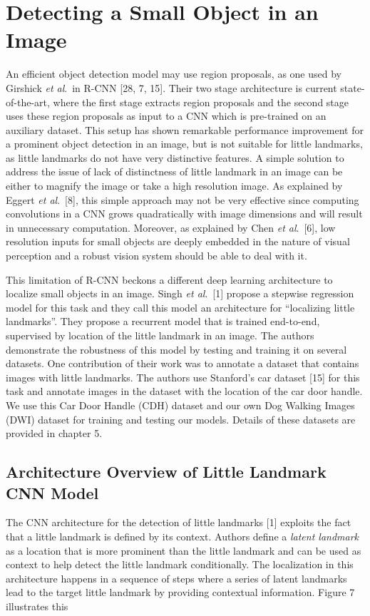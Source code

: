 \documentclass [11pt,letterpaper ,twoside ,openany ]{report}
\begin{document}
    \chapter{Detecting a Small Object in an Image}
    \doublespacing
    An efficient object detection model may use region proposals, as  one used by Girshick \textit{et al}.\ in R-CNN [28, 7, 15]. Their two stage architecture is current state-of-the-art, where the first stage extracts region proposals and the second stage uses these region proposals as input to a CNN which is pre-trained on an auxiliary dataset. This setup has shown remarkable performance improvement for a prominent object detection in an image, but is not suitable for little landmarks, as little landmarks do not have very distinctive features. A simple solution to address the issue of lack of distinctness of little landmark in an image can be either to magnify the image or take a high resolution image. As explained by Eggert \textit{et al}.\ [8], this simple approach may not be very effective since computing convolutions in a CNN grows quadratically with image dimensions and will result in unnecessary computation. Moreover, as explained by Chen \textit{et al}.\ [6], low resolution inputs for small objects are deeply embedded  in the nature of visual perception and a robust vision system should be able to deal with it.
        
    This limitation of R-CNN beckons a different deep learning architecture to localize small objects in an image. Singh \textit{et al}.\ [1] propose a stepwise regression model for this task and they call this model an architecture for ``localizing little landmarks''. They propose a recurrent model that is trained end-to-end, supervised by location of the little landmark in an image. The authors demonstrate the robustness of this model by testing and training it on several datasets. One contribution of their work was to annotate a dataset that contains images with little landmarks. The authors use Stanford's car dataset [15] for this task and annotate images in the dataset with the location of the car door handle. We use this Car Door Handle (CDH) dataset and our own Dog Walking Images (DWI) dataset for training and testing our models. Details of these datasets are provided in chapter 5.

    \section{Architecture Overview of Little Landmark CNN Model}
    The CNN architecture for the detection of little landmarks [1] exploits the fact that a little landmark is defined by its context. Authors define a \textit {latent landmark} as a location that is more prominent than the little landmark and can be used as context to help detect the little landmark conditionally. The localization in this architecture happens in a sequence of steps where a series of latent landmarks lead to the target little landmark by providing contextual information. Figure 7 illustrates this 
\end{document}
